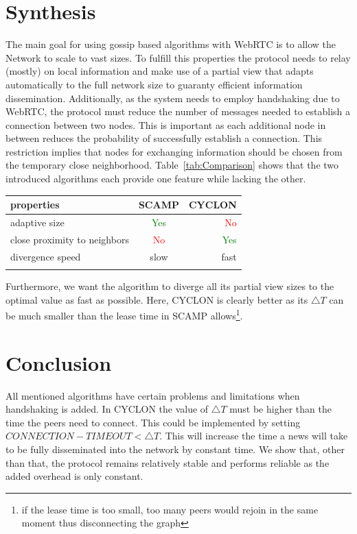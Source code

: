 \documentclass[11pt, english, screen]{report-rd-info}
\begin{document}
\section{Synthesis}

The main goal for using gossip based algorithms with WebRTC is to allow the Network to scale to vast sizes.
To fulfill this properties the protocol needs to relay (mostly) on local information and make use of a partial view that adapts automatically to the full network size to guaranty efficient information dissemination.
Additionally, as the system needs to employ handshaking due to WebRTC, the protocol must reduce the number of messages needed to establish a connection between two nodes.
This is important as each additional node in between reduces the probability of successfully establish a connection.
This restriction implies that nodes for exchanging information should be chosen from the temporary close neighborhood.
Table~\ref{tab:Comparison} shows that the two introduced algorithms each provide one feature while lacking the other.

\hfill \break
\begin{tabular}{l | c r }
 properties & SCAMP & CYCLON \\
  \hline
  adaptive size & \textcolor{green}{Yes} & \textcolor{red}{No} \\
  close proximity to neighbors & \textcolor{red}{No} & \textcolor{green}{Yes} \\
  divergence speed & slow & fast \\
  \label{tab:Comparison}
\end{tabular}
\hfill \break

Furthermore, we want the algorithm to diverge all its partial view sizes to the optimal value as fast as possible. 
Here, CYCLON is clearly better as its $\bigtriangleup T$ can be much smaller than the lease time in SCAMP allows\footnote{if the lease time is too small, too many peers would rejoin in the same moment thus disconnecting the graph}.

\section{Conclusion}

All mentioned algorithms have certain problems and limitations when handshaking is added.
In CYCLON the value of $\bigtriangleup T$ must be higher than the time the peers need to connect.
This could be implemented by setting $CONNECTION-TIMEOUT < \bigtriangleup T$.
This will increase the time a news will take to be fully disseminated into the network by constant time.
We show that, other than that, the protocol remains relatively stable and performs reliable as the added overhead is only constant.
\end{document}
